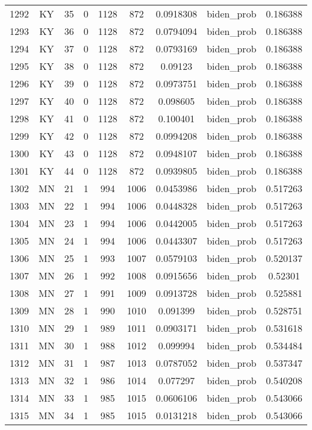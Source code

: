 \documentclass[12pt,a4paper]{article}
\begin{document}
\begin{tabular}{r|cccccccc}
	1292 & KY & 35 & 0 & 1128 & 872 & 0.0918308 & biden\_prob & 0.186388 \\
	1293 & KY & 36 & 0 & 1128 & 872 & 0.0794094 & biden\_prob & 0.186388 \\
	1294 & KY & 37 & 0 & 1128 & 872 & 0.0793169 & biden\_prob & 0.186388 \\
	1295 & KY & 38 & 0 & 1128 & 872 & 0.09123 & biden\_prob & 0.186388 \\
	1296 & KY & 39 & 0 & 1128 & 872 & 0.0973751 & biden\_prob & 0.186388 \\
	1297 & KY & 40 & 0 & 1128 & 872 & 0.098605 & biden\_prob & 0.186388 \\
	1298 & KY & 41 & 0 & 1128 & 872 & 0.100401 & biden\_prob & 0.186388 \\
	1299 & KY & 42 & 0 & 1128 & 872 & 0.0994208 & biden\_prob & 0.186388 \\
	1300 & KY & 43 & 0 & 1128 & 872 & 0.0948107 & biden\_prob & 0.186388 \\
	1301 & KY & 44 & 0 & 1128 & 872 & 0.0939805 & biden\_prob & 0.186388 \\
	1302 & MN & 21 & 1 & 994 & 1006 & 0.0453986 & biden\_prob & 0.517263 \\
	1303 & MN & 22 & 1 & 994 & 1006 & 0.0448328 & biden\_prob & 0.517263 \\
	1304 & MN & 23 & 1 & 994 & 1006 & 0.0442005 & biden\_prob & 0.517263 \\
	1305 & MN & 24 & 1 & 994 & 1006 & 0.0443307 & biden\_prob & 0.517263 \\
	1306 & MN & 25 & 1 & 993 & 1007 & 0.0579103 & biden\_prob & 0.520137 \\
	1307 & MN & 26 & 1 & 992 & 1008 & 0.0915656 & biden\_prob & 0.52301 \\
	1308 & MN & 27 & 1 & 991 & 1009 & 0.0913728 & biden\_prob & 0.525881 \\
	1309 & MN & 28 & 1 & 990 & 1010 & 0.091399 & biden\_prob & 0.528751 \\
	1310 & MN & 29 & 1 & 989 & 1011 & 0.0903171 & biden\_prob & 0.531618 \\
	1311 & MN & 30 & 1 & 988 & 1012 & 0.099994 & biden\_prob & 0.534484 \\
	1312 & MN & 31 & 1 & 987 & 1013 & 0.0787052 & biden\_prob & 0.537347 \\
	1313 & MN & 32 & 1 & 986 & 1014 & 0.077297 & biden\_prob & 0.540208 \\
	1314 & MN & 33 & 1 & 985 & 1015 & 0.0606106 & biden\_prob & 0.543066 \\
	1315 & MN & 34 & 1 & 985 & 1015 & 0.0131218 & biden\_prob & 0.543066 \\

\end{tabular}
\end{document}
